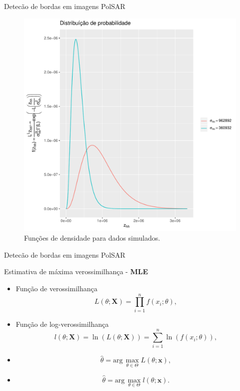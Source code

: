 \documentclass[10pt]{beamer}
\begin{document}
\begin{frame}{Detecão de bordas em imagens PolSAR}
\begin{figure}[hbt]
	\centering
  \includegraphics[scale = 0.4]{grafico_pdf_nhfc_2014_sigma_hh.pdf}
	\caption{Funções de densidade para dados simulados.}\label{cap_acf_fig02}
\end{figure}  
\end{frame}
\begin{frame}{Detecão de bordas em imagens PolSAR}
  \begin{alertblock}{Estimativa de máxima verossimilhança - \textbf{MLE}}
  \begin{itemize}
\item Função de verossimilhança
\begin{equation}\label{cap_acf_14}
    L(\theta;\mathbf{X}) = \prod_{i=1}^{n}f(x_i;\theta), 
\end{equation}
\item Função de log-verossimilhança
\begin{equation}\label{cap_acf_15}
	l(\theta;\mathbf{X})= \ln(L(\theta;\mathbf{X})) = \sum_{i=1}^{n}\ln(f(x_i;\theta)),
\end{equation}
\item 
\begin{equation}\label{cap_acf_16}
    \widehat{\theta}= \text{arg}\,\max\limits_{\theta\in\Theta}L(\theta;\mathbf{x}),
\end{equation}
\item
\begin{equation}\label{cap_acf_17}
    \widehat{\theta}= \text{arg}\,\max\limits_{\theta\in\Theta}l(\theta;\mathbf{x}).
\end{equation}
\end{itemize}
\end{alertblock}
\end{frame}
\end{document}

